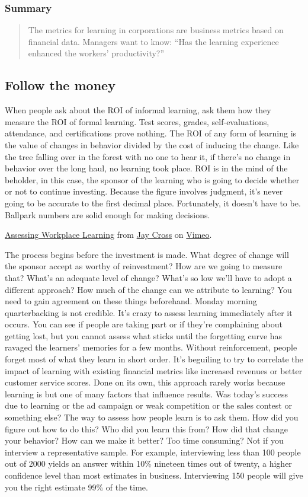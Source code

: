 \subsubsection{Summary}

\begin{quote}
The metrics for learning in corporations are business metrics based on
financial data. Managers want to know: ``Has the learning experience
enhanced the workers' productivity?''
\end{quote}
\subsection{Follow the money}

When people ask about the ROI of informal learning, ask them how they
measure the ROI of formal learning. Test scores, grades,
self-evaluations, attendance, and certifications prove nothing. The ROI
of any form of learning is the value of changes in behavior divided by
the cost of inducing the change. Like the tree falling over in the
forest with no one to hear it, if there's no change in behavior over the
long haul, no learning took place. ROI is in the mind of the beholder,
in this case, the sponsor of the learning who is going to decide whether
or not to continue investing. Because the figure involves judgment, it's
never going to be accurate to the first decimal place. Fortunately, it
doesn't have to be. Ballpark numbers are solid enough for making
decisions.

\href{http://vimeo.com/45989089}{Assessing Workplace Learning} from
\href{http://vimeo.com/user7021511}{Jay Cross} on
\href{http://vimeo.com}{Vimeo}.

The process begins before the investment is made. What degree of change
will the sponsor accept as worthy of reinvestment? How are we going to
measure that? What's an adequate level of change? What's so low we'll
have to adopt a different approach? How much of the change can we
attribute to learning? You need to gain agreement on these things
beforehand. Monday morning quarterbacking is not credible. It's crazy to
assess learning immediately after it occurs. You can see if people are
taking part or if they're complaining about getting lost, but you cannot
assess what sticks until the forgetting curve has ravaged the learners'
memories for a few months. Without reinforcement, people forget most of
what they learn in short order. It's beguiling to try to correlate the
impact of learning with existing financial metrics like increased
revenues or better customer service scores. Done on its own, this
approach rarely works because learning is but one of many factors that
influence results. Was today's success due to learning or the ad
campaign or weak competition or the sales contest or something else? The
way to assess how people learn is to ask them. How did you figure out
how to do this? Who did you learn this from? How did that change your
behavior? How can we make it better? Too time consuming? Not if you
interview a representative sample. For example, interviewing less than
100 people out of 2000 yields an answer within 10\% nineteen times out
of twenty, a higher confidence level than most estimates in business.
Interviewing 150 people will give you the right estimate 99\% of the
time.
